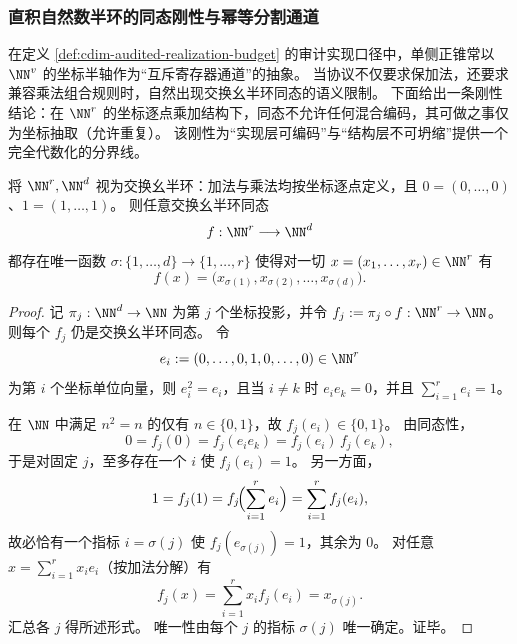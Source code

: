 \subsubsection{直积自然数半环的同态刚性与幂等分割通道}\label{subsubsec:cdim-semiring-rigidity}
在定义 \ref{def:cdim-audited-realization-budget} 的审计实现口径中，单侧正锥常以 \(\NN^v\) 的坐标半轴作为“互斥寄存器通道”的抽象。
当协议不仅要求保加法，还要求兼容乘法组合规则时，自然出现交换幺半环同态的语义限制。
下面给出一条刚性结论：在 \(\NN^r\) 的坐标逐点乘加结构下，同态不允许任何混合编码，其可做之事仅为坐标抽取（允许重复）。
该刚性为“实现层可编码”与“结构层不可坍缩”提供一个完全代数化的分界线。

\begin{theorem}[直积自然数半环的同态刚性]\label{thm:cdim-nr-nd-semiring-hom-rigidity}
将 \(\NN^r,\NN^d\) 视为交换幺半环：加法与乘法均按坐标逐点定义，且 \(0=(0,\dots,0)\)、\(1=(1,\dots,1)\)。
则任意交换幺半环同态
\[
f:\NN^r\longrightarrow \NN^d
\]
都存在唯一函数 \(\sigma:\{1,\dots,d\}\to\{1,\dots,r\}\) 使得对一切 \(x=(x_1,\dots,x_r)\in\NN^r\) 有
\[
f(x)=\bigl(x_{\sigma(1)},x_{\sigma(2)},\dots,x_{\sigma(d)}\bigr).
\]
\end{theorem}
\begin{proof}
记 \(\pi_j:\NN^d\to\NN\) 为第 \(j\) 个坐标投影，并令 \(f_j:=\pi_j\circ f:\NN^r\to\NN\)。
则每个 \(f_j\) 仍是交换幺半环同态。
令
\[
e_i:=(0,\dots,0,1,0,\dots,0)\in\NN^r
\]
为第 \(i\) 个坐标单位向量，则 \(e_i^2=e_i\)，且当 \(i\neq k\) 时 \(e_ie_k=0\)，并且 \(\sum_{i=1}^r e_i=1\)。
\par
在 \(\NN\) 中满足 \(n^2=n\) 的仅有 \(n\in\{0,1\}\)，故 \(f_j(e_i)\in\{0,1\}\)。
由同态性，
\[
0=f_j(0)=f_j(e_ie_k)=f_j(e_i)\,f_j(e_k),
\]
于是对固定 \(j\)，至多存在一个 \(i\) 使 \(f_j(e_i)=1\)。
另一方面，
\[
1=f_j(1)=f_j\!\Bigl(\sum_{i=1}^r e_i\Bigr)=\sum_{i=1}^r f_j(e_i),
\]
故必恰有一个指标 \(i=\sigma(j)\) 使 \(f_j(e_{\sigma(j)})=1\)，其余为 \(0\)。
对任意 \(x=\sum_{i=1}^r x_ie_i\)（按加法分解）有
\[
f_j(x)=\sum_{i=1}^r x_i f_j(e_i)=x_{\sigma(j)}.
\]
汇总各 \(j\) 得所述形式。
唯一性由每个 \(j\) 的指标 \(\sigma(j)\) 唯一确定。证毕。
\end{proof}

